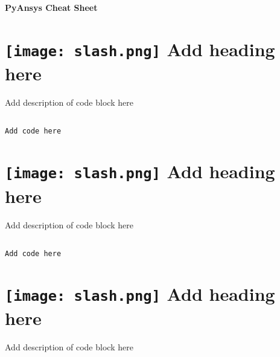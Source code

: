 \documentclass[9pt,landscape]{article}
\begin{document}
\raggedright
\footnotesize


\begin{center}
     \Huge{\textbf{PyAnsys Cheat Sheet}} \\
\end{center}
\vspace{-0.15cm}
\noindent\makebox[\linewidth]{\rule{\paperwidth}{2pt}}

\begin{multicols}{3}
\setlength{\premulticols}{1pt}
\setlength{\postmulticols}{1pt}
\setlength{\multicolsep}{1pt}
\setlength{\columnsep}{2pt}


\section{\texttt{[image: slash.png]} Add heading here}
Add description of code block here
\begin{lstlisting}[language=Python]

Add code here

\end{lstlisting}


\vfill
\section{\texttt{[image: slash.png]}  Add heading here}
Add description of code block here
\begin{lstlisting}[language=Python]

Add code here

\end{lstlisting} 

\vfill
\section{\texttt{[image: slash.png]}  Add heading here}
Add description of code block here
\begin{lstlisting}[language=Python]


\end{lstlisting}
\end{multicols}
\end{document}
